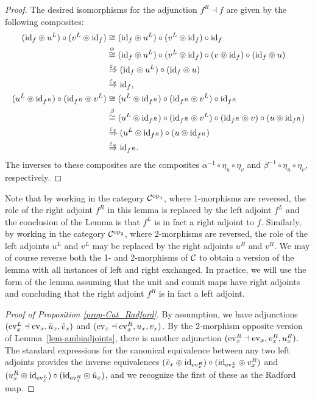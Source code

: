\documentclass{amsart}
\begin{document}
\begin{proof}
The desired isomorphisms for the adjunction $f^R \dashv f$ are given by the following composites:
\begin{align*}
	(\mathrm{id}_{f} \circledcirc u^L) \circ (v^L \circledcirc \mathrm{id}_{f} )
		& \cong (\mathrm{id}_{f} \circledcirc u^L) \circ (v^L \circledcirc \mathrm{id}_{f} ) \circ \mathrm{id}_f\\
		& \stackrel{\alpha}{\cong} (\mathrm{id}_{f} \circledcirc u^L) \circ (v^L \circledcirc \mathrm{id}_{f} ) \circ (v \circledcirc \mathrm{id}_f) \circ (\mathrm{id}_f \circledcirc u) \\
		&  \stackrel{\varepsilon_v }{\Rightarrow} (\mathrm{id}_{f} \circledcirc u^L) \circ (\mathrm{id}_f \circledcirc u) \\
		& \stackrel{\varepsilon_u }{\Rightarrow} \mathrm{id}_{f},  \\
	(u^L \circledcirc \mathrm{id}_{f^R}) \circ (\mathrm{id}_{f^R} \circledcirc v^L) 
		& \cong  (u^L \circledcirc \mathrm{id}_{f^R}) \circ (\mathrm{id}_{f^R} \circledcirc v^L) \circ \mathrm{id}_{f^R} \\
		& \stackrel{\beta}{\cong}  (u^L \circledcirc \mathrm{id}_{f^R}) \circ (\mathrm{id}_{f^R} \circledcirc v^L) \circ (\mathrm{id}_{f^R} \circledcirc v) \circ (u \circledcirc \mathrm{id}_{f^R} ) \\
		& \stackrel{\varepsilon_v }{\Rightarrow} (u^L \circledcirc \mathrm{id}_{f^R}) \circ (u \circledcirc \mathrm{id}_{f^R} ) \\
		& \stackrel{\varepsilon_u }{\Rightarrow} \mathrm{id}_{f^R}.
\end{align*}
The inverses to these composites are the composites $\alpha^{-1} \circ \eta_u \circ \eta_v$ and $\beta^{-1} \circ \eta_u \circ \eta_v$, respectively.
\end{proof}

Note that by working in the category $\mathcal C^{\mathrm{op}_1}$, where 1-morphisms are reversed, the role of the right adjoint $f^R$ in this lemma is replaced by the left adjoint $f^L$ and the conclusion of the Lemma is that $f^L$ is in fact a right adjoint to $f$.  Similarly, by working in the category $\mathcal C^{\mathrm{op}_2}$, where 2-morphisms are reversed, the role of the left adjoints $u^L$ and $v^L$ may be replaced by the right adjoints $u^R$ and $v^R$.  We may of course reverse both the 1- and 2-morphisms of $\mathcal C$ to obtain a version of the lemma with all instances of left and right exchanged.  In practice, we will use the form of the lemma assuming that the unit and counit maps have right adjoints and concluding that the right adjoint $f^R$ is in fact a left adjoint.

\begin{proof}[Proof of Proposition \ref{prop-Cat_Radford}]
By assumption, we have adjunctions $(\mathrm{ev}_x^L \dashv \mathrm{ev}_x, \tilde{u}_x, \tilde{v}_x)$ and $(\mathrm{ev}_x \dashv \mathrm{ev}_x^R, u_x, v_x)$.  By the 2-morphism opposite version of Lemma~\ref{lem-ambiadjoints}, there is another adjunction $(\mathrm{ev}_x^R \dashv\mathrm{ev}_x,v_x^R,u_x^R)$.  The standard expressions for the canonical equivalence between any two left adjoints provides the inverse equivalences
$(\tilde{v}_x \circledcirc \mathrm{id}_{\mathrm{ev}_x^R})\circ (\mathrm{id}_{\mathrm{ev}_x^L} \circledcirc v_x^R)$
and
$(u_x^R \circledcirc \mathrm{id}_{\mathrm{ev}_x^L}) \circ (\mathrm{id}_{\mathrm{ev}_x^R} \circledcirc \tilde{u}_x)$, and we recognize the first of these as the Radford map.
\end{proof}
\end{document}
